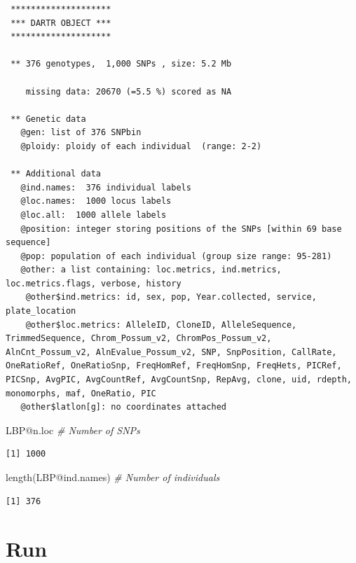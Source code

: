 \documentclass[
  letterpaper,
  DIV=11,
  numbers=noendperiod]{scrreprt}
\newenvironment{Shaded}{\begin{snugshade}}{\end{snugshade}}
\newcommand{\CommentTok}[1]{\textcolor[rgb]{0.38,0.63,0.69}{\textit{#1}}}
\newcommand{\FunctionTok}[1]{\textcolor[rgb]{0.02,0.16,0.49}{#1}}
\newcommand{\NormalTok}[1]{\textcolor[rgb]{0.00,0.44,0.13}{#1}}
\newcommand{\SpecialCharTok}[1]{\textcolor[rgb]{0.25,0.44,0.63}{#1}}
\let\textttOrig\texttt
\renewcommand{\texttt}[1]{\textttOrig{\color{blue}{#1}}}
\begin{document}
\begin{verbatim}
 ********************
 *** DARTR OBJECT ***
 ********************

 ** 376 genotypes,  1,000 SNPs , size: 5.2 Mb

    missing data: 20670 (=5.5 %) scored as NA

 ** Genetic data
   @gen: list of 376 SNPbin
   @ploidy: ploidy of each individual  (range: 2-2)

 ** Additional data
   @ind.names:  376 individual labels
   @loc.names:  1000 locus labels
   @loc.all:  1000 allele labels
   @position: integer storing positions of the SNPs [within 69 base sequence]
   @pop: population of each individual (group size range: 95-281)
   @other: a list containing: loc.metrics, ind.metrics, loc.metrics.flags, verbose, history 
    @other$ind.metrics: id, sex, pop, Year.collected, service, plate_location 
    @other$loc.metrics: AlleleID, CloneID, AlleleSequence, TrimmedSequence, Chrom_Possum_v2, ChromPos_Possum_v2, AlnCnt_Possum_v2, AlnEvalue_Possum_v2, SNP, SnpPosition, CallRate, OneRatioRef, OneRatioSnp, FreqHomRef, FreqHomSnp, FreqHets, PICRef, PICSnp, AvgPIC, AvgCountRef, AvgCountSnp, RepAvg, clone, uid, rdepth, monomorphs, maf, OneRatio, PIC 
   @other$latlon[g]: no coordinates attached
\end{verbatim}

\begin{Shaded}
\begin{Highlighting}[]
\NormalTok{LBP}\SpecialCharTok{@}\NormalTok{n.loc  }\CommentTok{\# Number of SNPs}
\end{Highlighting}
\end{Shaded}

\begin{verbatim}
[1] 1000
\end{verbatim}

\begin{Shaded}
\begin{Highlighting}[]
\FunctionTok{length}\NormalTok{(LBP}\SpecialCharTok{@}\NormalTok{ind.names)  }\CommentTok{\# Number of individuals}
\end{Highlighting}
\end{Shaded}

\begin{verbatim}
[1] 376
\end{verbatim}

\hypertarget{run-filter.sex.linked-1}{%
\section*{\texorpdfstring{Run
\texttt{filter.sex.linked}}{Run filter.sex.linked}}\label{run-filter.sex.linked-1}}
\addcontentsline{toc}{section}{Run \texttt{filter.sex.linked}}
\end{document}
